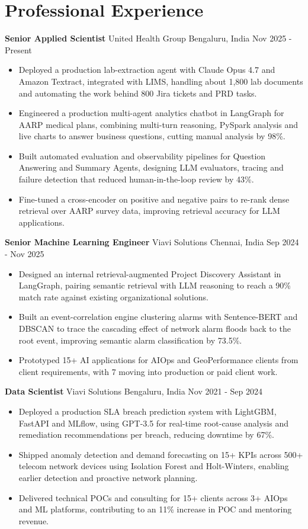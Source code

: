 \documentclass[10pt,a4paper]{article}
\newcommand{\role}[4]{\textbf{#1} \textbar{} #2 \hfill #3 \textbar{} #4\par}
\begin{document}
\section{Professional Experience}
\role{Senior Applied Scientist}{United Health Group}{Bengaluru, India}{Nov 2025 - Present}
\begin{itemize}
  \item Deployed a production lab-extraction agent with Claude Opus 4.7 and Amazon Textract, integrated with LIMS, handling about 1,800 lab documents and automating the work behind 800 Jira tickets and PRD tasks.
  \item Engineered a production multi-agent analytics chatbot in LangGraph for AARP medical plans, combining multi-turn reasoning, PySpark analysis and live charts to answer business questions, cutting manual analysis by 98\%.
  \item Built automated evaluation and observability pipelines for Question Answering and Summary Agents, designing LLM evaluators, tracing and failure detection that reduced human-in-the-loop review by 43\%.
  \item Fine-tuned a cross-encoder on positive and negative pairs to re-rank dense retrieval over AARP survey data, improving retrieval accuracy for LLM applications.
\end{itemize}
\vspace{3pt}
\role{Senior Machine Learning Engineer}{Viavi Solutions}{Chennai, India}{Sep 2024 - Nov 2025}
\begin{itemize}
  \item Designed an internal retrieval-augmented Project Discovery Assistant in LangGraph, pairing semantic retrieval with LLM reasoning to reach a 90\% match rate against existing organizational solutions.
  \item Built an event-correlation engine clustering alarms with Sentence-BERT and DBSCAN to trace the cascading effect of network alarm floods back to the root event, improving semantic alarm classification by 73.5\%.
  \item Prototyped 15+ AI applications for AIOps and GeoPerformance clients from client requirements, with 7 moving into production or paid client work.
\end{itemize}
\vspace{3pt}
\role{Data Scientist}{Viavi Solutions}{Bengaluru, India}{Nov 2021 - Sep 2024}
\begin{itemize}
  \item Deployed a production SLA breach prediction system with LightGBM, FastAPI and MLflow, using GPT-3.5 for real-time root-cause analysis and remediation recommendations per breach, reducing downtime by 67\%.
  \item Shipped anomaly detection and demand forecasting on 15+ KPIs across 500+ telecom network devices using Isolation Forest and Holt-Winters, enabling earlier detection and proactive network planning.
  \item Delivered technical POCs and consulting for 15+ clients across 3+ AIOps and ML platforms, contributing to an 11\% increase in POC and mentoring revenue.
\end{itemize}
\end{document}
